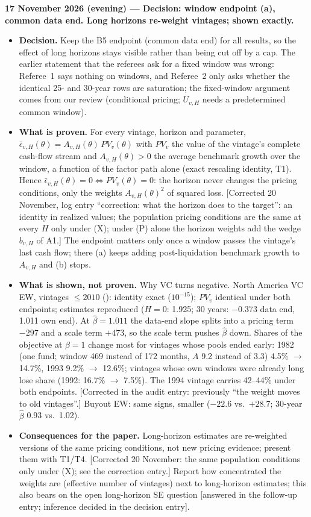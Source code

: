 \documentclass[11pt]{article}
\newcommand{\file}[1]{\path{#1}}
\begin{document}
\textbf{17 November 2026 (evening) --- Decision: window endpoint (a), common data end. Long horizons re-weight vintages; shown exactly.}
\begin{itemize}
\item \textbf{Decision.} Keep the B5 endpoint (common data end) for all results, so the effect of long horizons stays visible rather than being cut off by a cap. The earlier statement that the referees ask for a fixed window was wrong: Referee~1 says nothing on windows, and Referee~2 only asks whether the identical 25- and 30-year rows are saturation; the fixed-window argument comes from our review (conditional pricing; $U_{v,H}$ needs a predetermined common window).
\item \textbf{What is proven.} For every vintage, horizon and parameter, $\bar\epsilon_{v,H}(\theta)=A_{v,H}(\theta)\,PV_v(\theta)$ with $PV_v$ the value of the vintage's complete cash-flow stream and $A_{v,H}(\theta)>0$ the average benchmark growth over the window, a function of the factor path alone (exact rescaling identity, T1). Hence $\bar\epsilon_{v,H}(\theta)=0 \iff PV_v(\theta)=0$: the horizon never changes the pricing conditions, only the weights $A_{v,H}(\theta)^2$ of squared loss. [Corrected 20 November, log entry ``correction: what the horizon does to the target'': an identity in realized values; the population pricing conditions are the same at every $H$ only under (X); under (P) alone the horizon weights add the wedge $b_{v,H}$ of A1.] The endpoint matters only once a window passes the vintage's last cash flow; there (a) keeps adding post-liquidation benchmark growth to $A_{v,H}$ and (b) stops.
\item \textbf{What is shown, not proven.} Why VC turns negative. North America VC EW, vintages $\le 2010$ (\file{archive/check_horizon_reweighting.R}): identity exact ($10^{-15}$); $PV_v$ identical under both endpoints; estimates reproduced ($H=0$: 1.925; 30 years: $-0.373$ data end, 1.011 own end). At $\hat\beta=1.011$ the data-end slope splits into a pricing term $-297$ and a scale term $+473$, so the scale term pushes $\hat\beta$ down. Shares of the objective at $\beta=1$ change most for vintages whose pools ended early: 1982 (one fund; window 469 instead of 172 months, $A$ 9.2 instead of 3.3) 4.5\% $\to$ 14.7\%, 1993 9.2\% $\to$ 12.6\%; vintages whose own windows were already long lose share (1992: 16.7\% $\to$ 7.5\%). The 1994 vintage carries 42--44\% under both endpoints. [Corrected in the audit entry: previously ``the weight moves to old vintages''.] Buyout EW: same signs, smaller ($-22.6$ vs.\ $+28.7$; 30-year $\hat\beta$ 0.93 vs.\ 1.02).
\item \textbf{Consequences for the paper.} Long-horizon estimates are re-weighted versions of the same pricing conditions, not new pricing evidence; present them with T1/T4. [Corrected 20 November: the same population conditions only under (X); see the correction entry.] Report how concentrated the weights are (effective number of vintages) next to long-horizon estimates; this also bears on the open long-horizon SE question [answered in the follow-up entry; inference decided in the decision entry].
\end{itemize}
\end{document}
